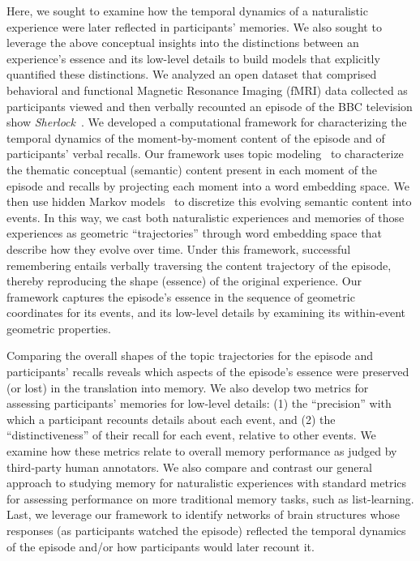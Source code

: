 \documentclass[10pt]{article}
\begin{document}
Here, we sought to examine how the temporal dynamics of a naturalistic experience were later reflected in participants' memories.  We also sought to leverage the above conceptual insights into the distinctions between an experience's essence and its low-level details to build models that explicitly quantified these distinctions.  We analyzed an open dataset that comprised behavioral and functional Magnetic Resonance Imaging (fMRI) data collected as participants viewed and then verbally recounted an episode of the BBC television show \textit{Sherlock}~\citep{ChenEtal17}.  We developed a computational framework for characterizing the temporal dynamics of the moment-by-moment content of the episode and of participants' verbal recalls.  Our framework uses topic modeling~\citep{BleiEtal03} to characterize the thematic conceptual (semantic) content present in each moment of the episode and recalls by projecting each moment into a word embedding space.  We then use hidden Markov models~\citep{Rabi89, BaldEtal17} to discretize this evolving semantic content into events.  In this way, we cast both naturalistic experiences and memories of those experiences as geometric ``trajectories'' through word embedding space that describe how they evolve over time. Under this framework, successful remembering entails verbally traversing the content trajectory of the episode, thereby reproducing the shape (essence) of the original experience.  Our framework captures the episode's essence in the sequence of geometric coordinates for its events, and its low-level details by examining its within-event geometric properties.

Comparing the overall shapes of the topic trajectories for the episode and participants' recalls reveals which aspects of the episode's essence were preserved (or lost) in the translation into memory.  We also develop two metrics for assessing participants' memories for low-level details: (1) the ``precision'' with which a participant recounts details about each event, and (2) the ``distinctiveness'' of their recall for each event, relative to other events.  We examine how these metrics relate to overall memory performance as judged by third-party human annotators.  We also compare and contrast our general approach to studying memory for naturalistic experiences with standard metrics for assessing performance on more traditional memory tasks, such as list-learning.  Last, we leverage our framework to identify networks of brain structures whose responses (as participants watched the episode) reflected the temporal dynamics of the episode and/or how participants would later recount it.
\end{document}

